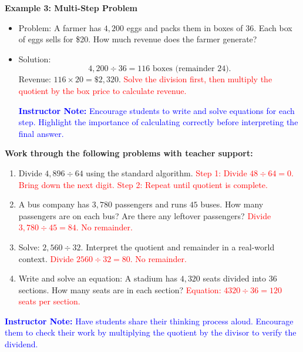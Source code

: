 \documentclass[12pt]{article}
\begin{document}
\begin{tcolorbox}[colframe=black!60, colback=white, 
coltitle=black, colbacktitle=black!15, fonttitle=\bfseries\Large, 
title=Examples, halign title=center, left=10pt, right=10pt, top=10pt, bottom=15pt]
\textbf{Example 3: Multi-Step Problem}
\begin{itemize}
    \item Problem: A farmer has \( 4,200 \) eggs and packs them in boxes of \( 36 \). Each box of eggs sells for \$20. How much revenue does the farmer generate?
    \item Solution:
    \[
    4,200 \div 36 = 116 \text{ boxes (remainder 24).}
    \]
    Revenue: \( 116 \times 20 = \$2,320 \). \textcolor{red}{Solve the division first, then multiply the quotient by the box price to calculate revenue.}

    \textcolor{blue}{\textbf{Instructor Note:} Encourage students to write and solve equations for each step. Highlight the importance of calculating correctly before interpreting the final answer.}
\end{itemize}
\end{tcolorbox}

\vspace{1em}

\begin{tcolorbox}[colframe=black!60, colback=white, 
coltitle=black, colbacktitle=black!15, fonttitle=\bfseries\Large, 
title=Guided Practice, halign title=center, left=10pt, right=10pt, top=10pt, bottom=15pt]
\textbf{Work through the following problems with teacher support:}
\begin{enumerate}[itemsep=3em]
    \item Divide \( 4,896 \div 64 \) using the standard algorithm. \textcolor{red}{Step 1: Divide \( 48 \div 64 = 0 \). Bring down the next digit. Step 2: Repeat until quotient is complete.}
    \item A bus company has \( 3,780 \) passengers and runs \( 45 \) buses. How many passengers are on each bus? Are there any leftover passengers? \textcolor{red}{Divide \( 3,780 \div 45 = 84 \). No remainder.}
    \item Solve: \( 2,560 \div 32 \). Interpret the quotient and remainder in a real-world context. \textcolor{red}{Divide \( 2560 \div 32 = 80 \). No remainder.}
    \item Write and solve an equation: A stadium has \( 4,320 \) seats divided into \( 36 \) sections. How many seats are in each section? \textcolor{red}{Equation: \( 4320 \div 36 = 120 \) seats per section.}
\end{enumerate}

\textcolor{blue}{\textbf{Instructor Note:} Have students share their thinking process aloud. Encourage them to check their work by multiplying the quotient by the divisor to verify the dividend.}
\end{tcolorbox}
\end{document}

